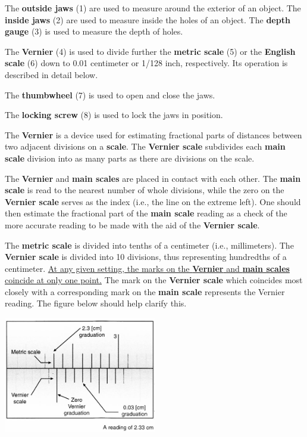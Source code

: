The \textbf{outside jaws} (1) are used to measure around the exterior of an object.  The \textbf{inside jaws} (2) are used to measure inside the holes of an object.  The \textbf{depth gauge} (3) is used to measure the depth of holes.

The \textbf{Vernier} (4) is used to divide further the \textbf{metric scale} (5) or the \textbf{English scale} (6) down to 0.01 centimeter or 1/128 inch, respectively.  Its operation is described in detail below.

The \textbf{thumbwheel} (7) is used to open and close the jaws.

The \textbf{locking screw} (8) is used to lock the jaws in position.

The \textbf{Vernier} is a device used for estimating fractional parts of distances between two adjacent divisions on a \textbf{scale}.  The \textbf{Vernier scale} subdivides each \textbf{main scale} division into as many parts as there are divisions on the scale.

The \textbf{Vernier} and \textbf{main scales} are placed in contact with each other.  The \textbf{main scale} is read to the nearest number of whole divisions, while the zero on the \textbf{Vernier scale} serves as the index (i.e., the line on the extreme left).  One should then estimate the fractional part of the \textbf{main scale} reading as a check of the more accurate reading to be made with the aid of the \textbf{Vernier scale}.

The \textbf{metric scale} is divided into tenths of a centimeter (i.e., millimeters).  The \textbf{Vernier scale} is divided into 10 divisions, thus representing hundredths of a centimeter.  \ul{At any given setting, the marks on the \textbf{Vernier} and \textbf{main scales} coincide at only one point.}  The mark on the \textbf{Vernier scale} which coincides most closely with a corresponding mark on the \textbf{main scale} represents the Vernier reading.  The figure below should help clarify this.
\begin{center} \includegraphics*[width=0.5\textwidth]{imgs/6labs/6Alab/6Aexp2/caliper_alt_2.jpg} \end{center}

